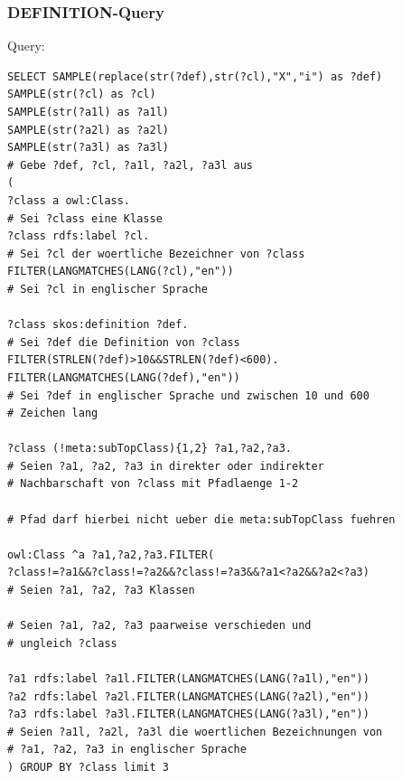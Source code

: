 \documentclass[headsepline,titlepage,ngerman,twoside,12pt]{report}
\begin{document}
\subsubsection{DEFINITION-Query}
Query:
\begin{lstlisting}
SELECT SAMPLE(replace(str(?def),str(?cl),"X","i") as ?def)
SAMPLE(str(?cl) as ?cl) 
SAMPLE(str(?a1l) as ?a1l)
SAMPLE(str(?a2l) as ?a2l)
SAMPLE(str(?a3l) as ?a3l)
# Gebe ?def, ?cl, ?a1l, ?a2l, ?a3l aus
(
?class a owl:Class.
# Sei ?class eine Klasse
?class rdfs:label ?cl.
# Sei ?cl der woertliche Bezeichner von ?class
FILTER(LANGMATCHES(LANG(?cl),"en"))
# Sei ?cl in englischer Sprache

?class skos:definition ?def.
# Sei ?def die Definition von ?class
FILTER(STRLEN(?def)>10&&STRLEN(?def)<600).
FILTER(LANGMATCHES(LANG(?def),"en"))
# Sei ?def in englischer Sprache und zwischen 10 und 600
# Zeichen lang

?class (!meta:subTopClass){1,2} ?a1,?a2,?a3.
# Seien ?a1, ?a2, ?a3 in direkter oder indirekter
# Nachbarschaft von ?class mit Pfadlaenge 1-2

# Pfad darf hierbei nicht ueber die meta:subTopClass fuehren

owl:Class ^a ?a1,?a2,?a3.FILTER(
?class!=?a1&&?class!=?a2&&?class!=?a3&&?a1<?a2&&?a2<?a3)
# Seien ?a1, ?a2, ?a3 Klassen

# Seien ?a1, ?a2, ?a3 paarweise verschieden und
# ungleich ?class

?a1 rdfs:label ?a1l.FILTER(LANGMATCHES(LANG(?a1l),"en"))
?a2 rdfs:label ?a2l.FILTER(LANGMATCHES(LANG(?a2l),"en"))
?a3 rdfs:label ?a3l.FILTER(LANGMATCHES(LANG(?a3l),"en"))
# Seien ?a1l, ?a2l, ?a3l die woertlichen Bezeichnungen von
# ?a1, ?a2, ?a3 in englischer Sprache
) GROUP BY ?class limit 3

\end{lstlisting}
\end{document}
